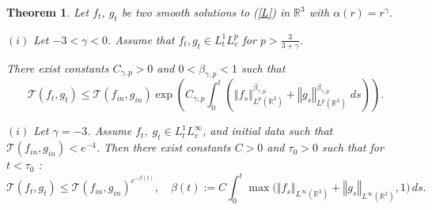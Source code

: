 \documentclass[11pt]{amsart}
\numberwithin{equation}{section}
\newtheorem{theorem}{Theorem}
\begin{document}
% 
\begin{theorem}\label{thm:w2_estimate_non_Coulomb}
  Let $f_t$, $g_t$ be two smooth solutions to (\ref{L}) in $\mathbb R^3$ with $\alpha(r)=r^{\gamma}$. 
  
  $(i)$   Let $-3<\gamma <0$. Assume that $f_t,g_t\in L_t^{1}L_{v}^{p}$ for $p>\frac{3}{3+\gamma}$. 
  
 There exist constants  $C_{\gamma,p}>0$ and $0<\beta_{\gamma,p}<1$ such that
  \begin{equation}\label{eq:contrac_estimate_non_coulomb}
    \mathcal T(f_{t},g_{t})\leq \mathcal T(f_{in},g_{in})\exp\left(C_{\gamma,p}\int_{0}^{t}\left(\left\Vert f_{s}\right\Vert _{L^{p}(\mathbb{R}^{3})}^{\beta_{\gamma,p}}+\left\Vert g_{s}\right\Vert _{L^{p}(\mathbb{R}^{3})}^{\beta_{\gamma,p}}\;ds\right)\right) .
  \end{equation}
  
 $(i)$ Let  $\gamma=-3$. Assume $f_t,\; g_t\in L_{t}^{1}L_{v}^{\infty}$, and  initial data such that  $\mathcal{T}(f_{in},g_{in})<e^{-4}$. Then there exist constants $C>0$ and $\tau_0>0$ such that for $t<\tau_0$ : 
  \begin{equation}\label{eq:contract_estimate_coulomb}
    \mathcal{T}(f_{t},g_{t})\leq\mathcal{T}(f_{in},g_{in})^{e^{-\beta(t)}},\quad\beta(t):=C\int_{0}^{t}\max\big(\left\Vert f_{s}\right\Vert _{L^{\infty}(\mathbb{R}^{3})}+\left\Vert g_{s}\right\Vert _{L^{\infty}(\mathbb{R}^{3})},1\big)\,ds.
  \end{equation}
\end{theorem}
\end{document}
